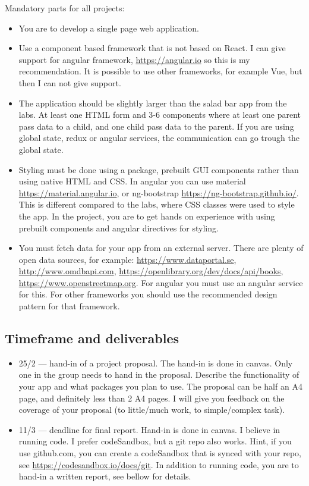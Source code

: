 \documentclass[fleqn, article, a4paper]{memoir}
\begin{document}
\noindent Mandatory parts for all projects:
\begin{itemize}\firmlist
\item You are to develop a single page web application.
\item Use a component based framework that is not based on React. I can give support for angular framework, \url{https://angular.io} so this is my recommendation. It is possible to use other frameworks, for example Vue, but then I can not give support.
\item The application should be slightly larger than the salad bar app from the labs. At least one HTML form and 3-6 components where at least one parent pass data to a child, and one child pass data to the parent. If you are using global state, redux or angular services, the communication can go trough the global state.
\item Styling must be done using a package, prebuilt GUI components rather than using native HTML and CSS. In angular you can use material \url{https://material.angular.io}, or ng-bootstrap \url{https://ng-bootstrap.github.io/}. This is different compared to the labs, where CSS classes were used to style the app. In the project, you are to get hands on experience with using prebuilt components and angular directives for styling.
\item You must fetch data for your app from an external server. There are plenty of open data sources, for example: \url{https://www.dataportal.se}, \url{http://www.omdbapi.com}, \url{https://openlibrary.org/dev/docs/api/books}, \url{https://www.openstreetmap.org}. For angular you must use an angular service for this. For other frameworks you should use the recommended design pattern for that framework.
\end{itemize}

\subsection*{Timeframe and deliverables}

\begin{itemize}
\item 25/2 --- hand-in of a project proposal. The hand-in is done in canvas. Only one in the group needs to hand in the proposal. Describe the functionality of your app and what packages you plan to use. The proposal can be half an A4 page, and definitely less than 2 A4 pages. I will give you feedback on the coverage of your proposal (to little/much work, to simple/complex task).
\item 11/3 --- deadline for final report. Hand-in is done in canvas. I believe in running code. I prefer codeSandbox, but a git repo also works. Hint, if you use github.com, you can create a codeSandbox that is synced with your repo, see \url{https://codesandbox.io/docs/git}. In addition to running code, you are to hand-in a written report, see bellow for details.
\end{itemize}
\end{document}
